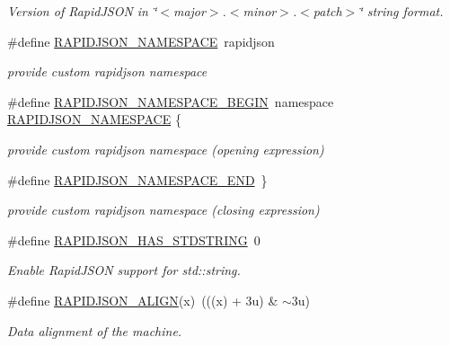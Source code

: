 \begin{DoxyCompactItemize}
\begin{DoxyCompactList}\small\item\em Version of Rapid\+J\+S\+ON in \char`\"{}$<$major$>$.$<$minor$>$.$<$patch$>$\char`\"{} string format. \end{DoxyCompactList}\item 
\#define \hyperlink{group___r_a_p_i_d_j_s_o_n___c_o_n_f_i_g_ga743a79d3af927391fe3eb5c979136899}{R\+A\+P\+I\+D\+J\+S\+O\+N\+\_\+\+N\+A\+M\+E\+S\+P\+A\+CE}~rapidjson
\begin{DoxyCompactList}\small\item\em provide custom rapidjson namespace \end{DoxyCompactList}\item 
\#define \hyperlink{group___r_a_p_i_d_j_s_o_n___c_o_n_f_i_g_gad3806c8251fdc7da9618b7e922674ffc}{R\+A\+P\+I\+D\+J\+S\+O\+N\+\_\+\+N\+A\+M\+E\+S\+P\+A\+C\+E\+\_\+\+B\+E\+G\+IN}~namespace \hyperlink{group___r_a_p_i_d_j_s_o_n___c_o_n_f_i_g_ga743a79d3af927391fe3eb5c979136899}{R\+A\+P\+I\+D\+J\+S\+O\+N\+\_\+\+N\+A\+M\+E\+S\+P\+A\+CE} \{
\begin{DoxyCompactList}\small\item\em provide custom rapidjson namespace (opening expression) \end{DoxyCompactList}\item 
\#define \hyperlink{group___r_a_p_i_d_j_s_o_n___c_o_n_f_i_g_gaf18f052a98b9f5df5448d39484b743c1}{R\+A\+P\+I\+D\+J\+S\+O\+N\+\_\+\+N\+A\+M\+E\+S\+P\+A\+C\+E\+\_\+\+E\+ND}~\}
\begin{DoxyCompactList}\small\item\em provide custom rapidjson namespace (closing expression) \end{DoxyCompactList}\item 
\#define \hyperlink{group___r_a_p_i_d_j_s_o_n___c_o_n_f_i_g_ga2f2eef0ee4477f3fe5874703a66e997f}{R\+A\+P\+I\+D\+J\+S\+O\+N\+\_\+\+H\+A\+S\+\_\+\+S\+T\+D\+S\+T\+R\+I\+NG}~0
\begin{DoxyCompactList}\small\item\em Enable Rapid\+J\+S\+ON support for {\ttfamily std\+::string}. \end{DoxyCompactList}\item 
\#define \hyperlink{group___r_a_p_i_d_j_s_o_n___c_o_n_f_i_g_ga583915242504c7fdb36e826f02f76242}{R\+A\+P\+I\+D\+J\+S\+O\+N\+\_\+\+A\+L\+I\+GN}(x)~(((x) + 3u) \& $\sim$3u)
\begin{DoxyCompactList}\small\item\em Data alignment of the machine. \end{DoxyCompactList}\item 

\end{DoxyCompactItemize}
